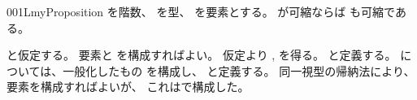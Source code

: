 \documentclass[index]{subfiles}
\begin{document}
\begin{myBlock}{001L}{myProposition}
  を階数、
  を型、
  を要素とする。
  が可縮ならば
  も可縮である。
\end{myBlock}
\begin{myProof}
  と仮定する。
  要素と
  を構成すればよい。
  仮定より
  ,
  を得る。
  と定義する。
  については、一般化したもの
  を構成し、
  と定義する。
  同一視型の帰納法により、
  要素を構成すればよいが、
  これはで構成した。
\end{myProof}
\end{document}
